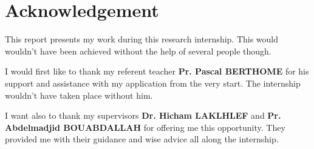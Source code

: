 \chapter*{Acknowledgement}

This report presents my work during this research internship. This would wouldn't have been achieved without the help of several people though.

I would first like to thank my referent teacher \textbf{Pr. Pascal BERTHOME} for his support and assistance with my application from the very start. The internship wouldn't have taken place without him.

I want also to thank my supervisors \textbf{Dr. Hicham LAKLHLEF} and \textbf{Pr. Abdelmadjid BOUABDALLAH} for offering me this opportunity. They provided me with their guidance and wise advice all along the internship.